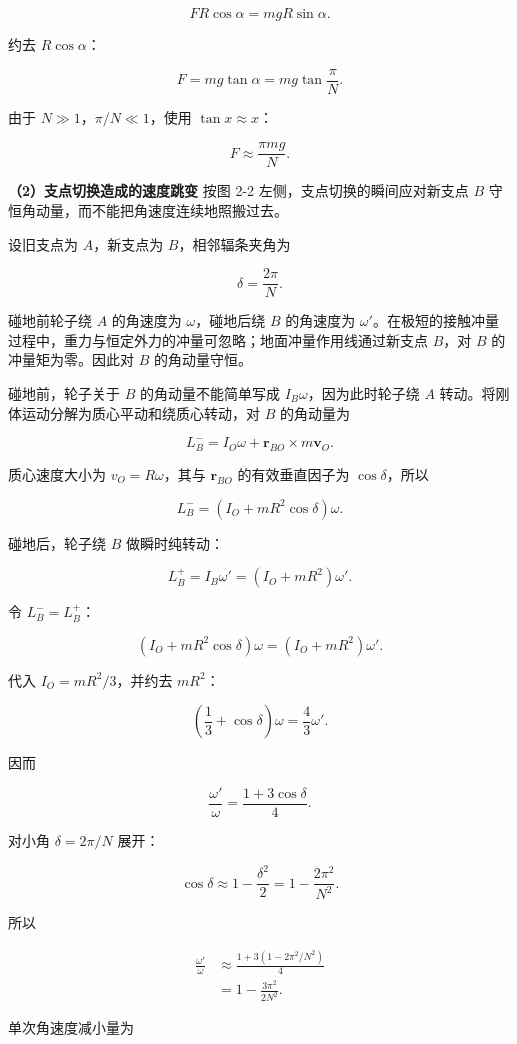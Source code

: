 \documentclass[12pt,a4paper,UTF8]{ctexart}
\begin{document}
\[F R\cos\alpha=mgR\sin\alpha.\]

约去 \(R\cos\alpha\)：

\[F=mg\tan\alpha=mg\tan\frac\pi N.\]

由于 \(N\gg1\)，\(\pi/N\ll1\)，使用 \(\tan x\approx x\)：

\[\boxed{F\approx\frac{\pi mg}{N}}.\]

\textbf{（2）支点切换造成的速度跳变} 按图 2-2
左侧，支点切换的瞬间应对新支点 \(B\)
守恒角动量，而不能把角速度连续地照搬过去。

设旧支点为 \(A\)，新支点为 \(B\)，相邻辐条夹角为

\[\delta=\frac{2\pi}{N}.\]

碰地前轮子绕 \(A\) 的角速度为 \(\omega\)，碰地后绕 \(B\) 的角速度为
\(\omega'\)。在极短的接触冲量过程中，重力与恒定外力的冲量可忽略；地面冲量作用线通过新支点
\(B\)，对 \(B\) 的冲量矩为零。因此对 \(B\) 的角动量守恒。

碰地前，轮子关于 \(B\) 的角动量不能简单写成
\(I_B\omega\)，因为此时轮子绕 \(A\)
转动。将刚体运动分解为质心平动和绕质心转动，对 \(B\) 的角动量为

\[L_B^-=I_O\omega+\bm r_{BO}\times m\bm v_O.\]

质心速度大小为 \(v_O=R\omega\)，其与 \(\bm r_{BO}\) 的有效垂直因子为
\(\cos\delta\)，所以

\[L_B^-=(I_O+mR^2\cos\delta)\omega.\]

碰地后，轮子绕 \(B\) 做瞬时纯转动：

\[L_B^+=I_B\omega'=(I_O+mR^2)\omega'.\]

令 \(L_B^-=L_B^+\)：

\[(I_O+mR^2\cos\delta)\omega=(I_O+mR^2)\omega'.\]

代入 \(I_O=mR^2/3\)，并约去 \(mR^2\)：

\[\left(\frac13+\cos\delta\right)\omega=\frac43\omega'.\]

因而

\[\frac{\omega'}\omega=\frac{1+3\cos\delta}{4}.\]

对小角 \(\delta=2\pi/N\) 展开：

\[\cos\delta\approx1-\frac{\delta^2}{2}
=1-\frac{2\pi^2}{N^2}.\]

所以

\[\begin{aligned}
\frac{\omega'}\omega
&\approx\frac{1+3\left(1-2\pi^2/N^2\right)}4\\
&=1-\frac{3\pi^2}{2N^2}.
\end{aligned}\]

单次角速度减小量为
\end{document}
